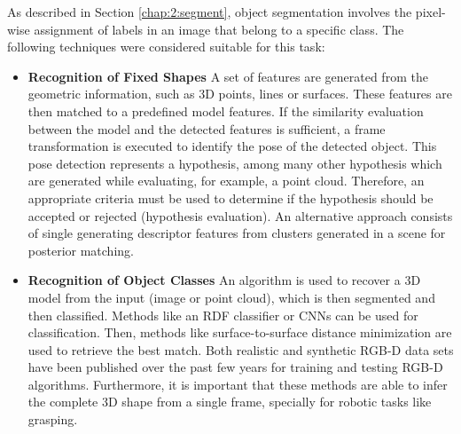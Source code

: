 As described in Section \ref{chap:2:segment}, object segmentation involves the pixel-wise assignment of labels in an image that belong to a specific class. The following techniques were considered suitable for this task:
\begin{itemize}
    \item \textbf{Recognition of Fixed Shapes} A set of features are generated from the geometric information, such as 3D points, lines or surfaces. These features are then matched to a predefined model features. If the similarity evaluation between the model and the detected features is sufficient, a frame transformation is executed to identify the pose of the detected object. This pose detection represents a hypothesis, among many other hypothesis which are generated while evaluating, for example, a point cloud. Therefore, an appropriate criteria must be used to determine if the hypothesis should be accepted or rejected (hypothesis evaluation). An alternative approach consists of single generating descriptor features from clusters generated in a scene for posterior matching.
    
    \item \textbf{Recognition of Object Classes} An algorithm is used to recover a 3D model from the input (image or point cloud), which is then segmented and then classified. Methods like an RDF classifier or CNNs can be used for classification. Then, methods like surface-to-surface distance minimization are used to retrieve the best match. Both realistic and synthetic RGB-D data sets have been published over the past few years for training and testing RGB-D algorithms. Furthermore, it is important that these methods are able to infer the complete 3D shape from a single frame, specially for robotic tasks like grasping.
    

\end{itemize}
